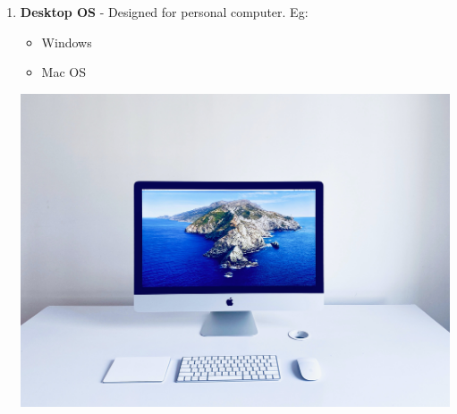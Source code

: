 \begin{flushleft}
\begin{enumerate}
		\item 
		\begin{multicols}{2}
			\textbf{Desktop OS} - Designed for personal computer.
			\newline
			Eg:
			\begin{itemize}
				\item Windows
				\item Mac OS
			\end{itemize}
			\vfill \null			
			\columnbreak
			\includegraphics[scale=.03]{content/chapter1/images/desktop.jpg}
		\end{multicols}
		\vspace{-25pt}
		
\bigskip
		

\end{enumerate}
\end{flushleft}
